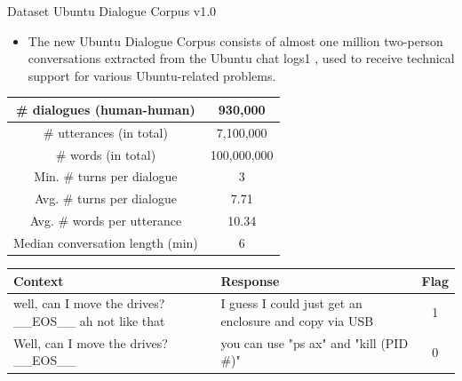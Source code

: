 \documentclass{beamer}
\begin{document}
\begin{frame}{Dataset Ubuntu Dialogue Corpus v1.0}
    \begin{itemize}
        \item The new Ubuntu Dialogue Corpus consists of
almost one million two-person conversations extracted from the Ubuntu chat logs1
, used to receive
technical support for various Ubuntu-related problems. 

    \end{itemize}
    \begin{center} \tiny
        \begin{tabular}{|c|c|}
\hline # dialogues (human-human) & 930,000 \\
\hline # utterances (in total) & 7,100,000 \\
\hline # words (in total) & 100,000,000 \\
\hline Min. # turns per dialogue & 3 \\
\hline Avg. # turns per dialogue & 7.71 \\
\hline Avg. # words per utterance & 10.34 \\
\hline Median conversation length (min) & 6 \\
\hline
\end{tabular}

\begin{tabular}{|l|l|c|}
\hline Context & Response & Flag \\
\hline well, can I move the drives? \_\_EOS\_\_ ah not like that & I guess I could just get an enclosure and copy via USB & 1 \\
\hline Well, can I move the drives? \_\_EOS\_\_ & you can use "ps ax" and "kill (PID #)" & 0 \\
\hline
\end{tabular}
    \end{center}
    
\end{frame}
\end{document}
